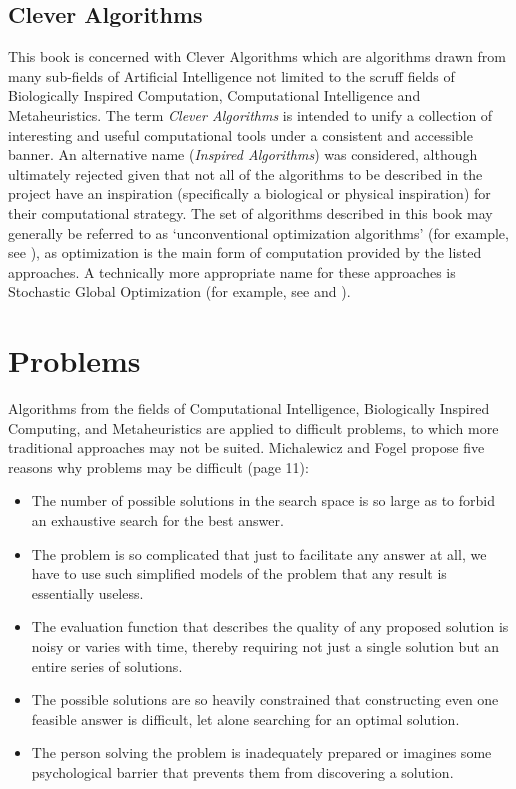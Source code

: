 \begin{bibunit}
% 
% 
\subsection{Clever Algorithms}
\label{sec:clever_algorithms}
This book is concerned with Clever Algorithms which are algorithms drawn from many sub-fields of Artificial Intelligence not limited to the scruff fields of Biologically Inspired Computation, Computational Intelligence and Metaheuristics. 
The term \emph{Clever Algorithms} is intended to unify a collection of interesting and useful computational tools under a consistent and accessible banner. An alternative name (\emph{Inspired Algorithms}) was considered, although ultimately rejected given that not all of the algorithms to be described in the project have an inspiration (specifically a biological or physical inspiration) for their computational strategy. 
The set of algorithms described in this book may generally be referred to as `unconventional optimization algorithms' (for example, see \cite{Corne1999}), as optimization is the main form of computation provided by the listed approaches. A technically more appropriate name for these approaches is Stochastic Global Optimization (for example, see \cite{Weise2007} and \cite{Luke2009}).

% 
% 
\section{Problems}
\label{sec:problems}
Algorithms from the fields of Computational Intelligence, Biologically Inspired Computing, and Metaheuristics are applied to difficult problems, to which more traditional approaches may not be suited.
Michalewicz and Fogel propose five reasons why problems may be difficult \cite{Michalewicz2004} (page 11):
\begin{itemize}
	\item The number of possible solutions in the search space is so large as to forbid an exhaustive search for the best answer.
	\item The problem is so complicated that just to facilitate any answer at all, we have to use such simplified models of the problem that any result is essentially useless.
	\item The evaluation function that describes the quality of any proposed solution is noisy or varies with time, thereby requiring not just a single solution but an entire series of solutions.
	\item The possible solutions are so heavily constrained that constructing even one feasible answer is difficult, let alone searching for an optimal solution.
	\item The person solving the problem is inadequately prepared or imagines some psychological barrier that prevents them from discovering a solution.
\end{itemize}


\end{bibunit}
